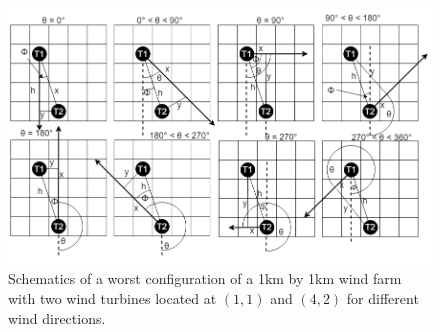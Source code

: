     \begin{figure}[H]
        \centering
        \includegraphics[width=\linewidth]{Figures/1142.png}
        \caption{Schematics of a worst configuration of a 1km by 1km wind farm with two wind turbines located at $(1,1)$ and $(4,2)$ for different wind directions.}
        \label{sampleSmall6}
    \end{figure}
    
